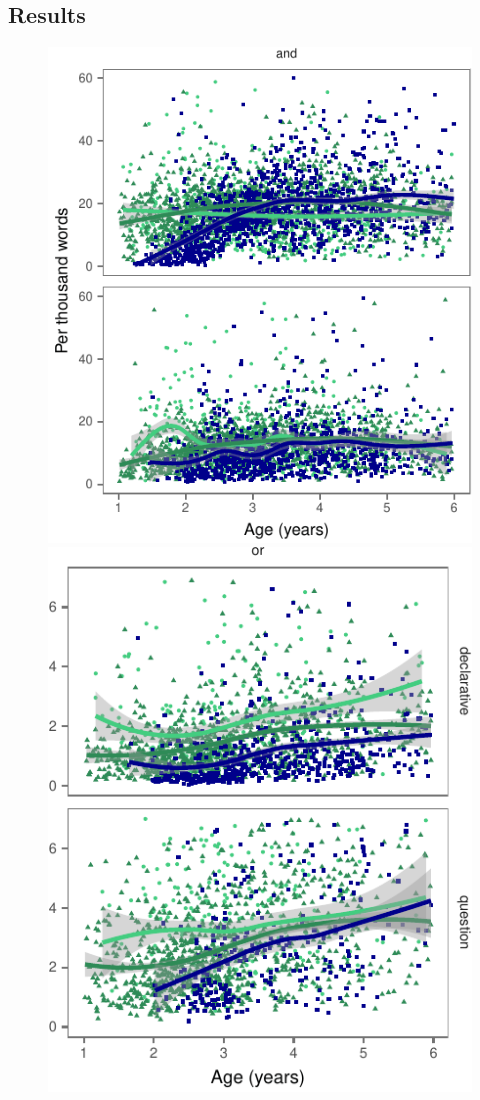 \documentclass[10pt, letterpaper]{article}
\newenvironment{CodeChunk}{}{}
\begin{document}
\subsection{Results}\label{results}

\begin{CodeChunk}
\begin{figure}[t]

{\centering \includegraphics{figs/byspeechActPlots-1} \includegraphics{figs/byspeechActPlots-2} 

}
\end{figure}
\end{CodeChunk}
\end{document}

